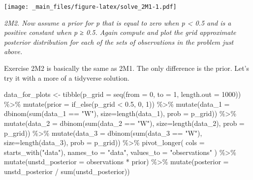 \documentclass[
]{book}
\newenvironment{Shaded}{\begin{snugshade}}{\end{snugshade}}
\newcommand{\AttributeTok}[1]{\textcolor[rgb]{0.77,0.63,0.00}{#1}}
\newcommand{\DecValTok}[1]{\textcolor[rgb]{0.00,0.00,0.81}{#1}}
\newcommand{\FloatTok}[1]{\textcolor[rgb]{0.00,0.00,0.81}{#1}}
\newcommand{\FunctionTok}[1]{\textcolor[rgb]{0.00,0.00,0.00}{#1}}
\newcommand{\NormalTok}[1]{#1}
\newcommand{\OtherTok}[1]{\textcolor[rgb]{0.56,0.35,0.01}{#1}}
\newcommand{\SpecialCharTok}[1]{\textcolor[rgb]{0.00,0.00,0.00}{#1}}
\newcommand{\StringTok}[1]{\textcolor[rgb]{0.31,0.60,0.02}{#1}}
\begin{document}
\texttt{[image: \_main\_files/figure-latex/solve\_2M1-1.pdf]}

\emph{2M2. Now assume a prior for p that is equal to zero when p \textless{} 0.5 and is a positive constant when p ≥ 0.5. Again compute and plot the grid approximate posterior distribution for each of the sets of observations in the problem just above.}

Exercise 2M2 is basically the same as 2M1. The only difference is the prior. Let's try it with a more of a tidyverse solution.

\begin{Shaded}
\begin{Highlighting}[]
\NormalTok{data\_for\_plots }\OtherTok{\textless{}{-}}
  \FunctionTok{tibble}\NormalTok{(}\AttributeTok{p\_grid =} \FunctionTok{seq}\NormalTok{(}\AttributeTok{from =} \DecValTok{0}\NormalTok{, }\AttributeTok{to =} \DecValTok{1}\NormalTok{, }\AttributeTok{length.out =} \DecValTok{1000}\NormalTok{)) }\SpecialCharTok{\%\textgreater{}\%}     
  \FunctionTok{mutate}\NormalTok{(}\AttributeTok{prior =} \FunctionTok{if\_else}\NormalTok{(p\_grid }\SpecialCharTok{\textless{}} \FloatTok{0.5}\NormalTok{, }\DecValTok{0}\NormalTok{, }\DecValTok{1}\NormalTok{)) }\SpecialCharTok{\%\textgreater{}\%} 
  \FunctionTok{mutate}\NormalTok{(}\AttributeTok{data\_1 =} \FunctionTok{dbinom}\NormalTok{(}\FunctionTok{sum}\NormalTok{(data\_1 }\SpecialCharTok{==} \StringTok{"W"}\NormalTok{), }\AttributeTok{size=}\FunctionTok{length}\NormalTok{(data\_1), }\AttributeTok{prob =}\NormalTok{ p\_grid)) }\SpecialCharTok{\%\textgreater{}\%}
  \FunctionTok{mutate}\NormalTok{(}\AttributeTok{data\_2 =} \FunctionTok{dbinom}\NormalTok{(}\FunctionTok{sum}\NormalTok{(data\_2 }\SpecialCharTok{==} \StringTok{"W"}\NormalTok{), }\AttributeTok{size=}\FunctionTok{length}\NormalTok{(data\_2), }\AttributeTok{prob =}\NormalTok{ p\_grid)) }\SpecialCharTok{\%\textgreater{}\%}
  \FunctionTok{mutate}\NormalTok{(}\AttributeTok{data\_3 =} \FunctionTok{dbinom}\NormalTok{(}\FunctionTok{sum}\NormalTok{(data\_3 }\SpecialCharTok{==} \StringTok{"W"}\NormalTok{), }\AttributeTok{size=}\FunctionTok{length}\NormalTok{(data\_3), }\AttributeTok{prob =}\NormalTok{ p\_grid)) }\SpecialCharTok{\%\textgreater{}\%}
  \FunctionTok{pivot\_longer}\NormalTok{(}
    \AttributeTok{cols =} \FunctionTok{starts\_with}\NormalTok{(}\StringTok{"data"}\NormalTok{),}
    \AttributeTok{names\_to =} \StringTok{"data"}\NormalTok{,}
    \AttributeTok{values\_to =} \StringTok{"observations"}
\NormalTok{  ) }\SpecialCharTok{\%\textgreater{}\%} 
  \FunctionTok{mutate}\NormalTok{(}\AttributeTok{unstd\_posterior =}\NormalTok{ observations }\SpecialCharTok{*}\NormalTok{ prior) }\SpecialCharTok{\%\textgreater{}\%}           
  \FunctionTok{mutate}\NormalTok{(}\AttributeTok{posterior =}\NormalTok{ unstd\_posterior }\SpecialCharTok{/} \FunctionTok{sum}\NormalTok{(unstd\_posterior))}




\end{Highlighting}
\end{Shaded}
\end{document}
